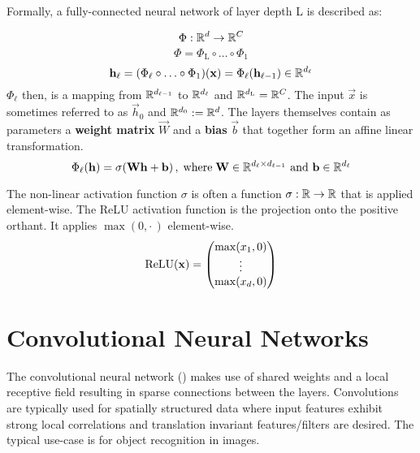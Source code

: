 Formally, a fully-connected neural network of layer depth L is described as:

\[
    \Phi : \mathbb{R}^d \to \mathbb{R}^C
\]
\[
    \Phi = \Phi_\text{L} \circ \ldots \circ \Phi_1
\]
\[
    \mathbf h_\ell = (\Phi_\ell \circ \ldots \circ \Phi_1) (\mathbf x) =
    \Phi_\ell(\mathbf h_{\ell-1}) \in \mathbb{R}^{d_\ell}
\]
$\Phi_\ell$ then, is a mapping from $\mathbb{R}^{d_{\ell-1}}$ to $\mathbb{R}^{d_\ell}$ and $\mathbb{R}^{d_\textnormal{L}} = \mathbb{R}^C$.
The input $\vec x$ is sometimes referred to as $\vec h_0$ and $\mathbb{R}^{d_0} := \mathbb{R}^d$.
The layers themselves contain as parameters a \textbf{weight matrix} $\vec W$ and a \textbf{bias} $\vec b$
that together form an affine linear transformation.
\[
    \Phi_\ell(\mathbf h) = \sigma (\mathbf W \mathbf h + \mathbf b) \,, \; \text{where} \;
    \mathbf W \in \mathbb{R}^{d_\ell \times d_{\ell-1}} \text{ and } 
    \mathbf b \in \mathbb{R}^{d_\ell}
\]

The non-linear activation function $\sigma$ is often a function $\sigma:\mathbb{R}\to\mathbb{R}$ that is applied element-wise.
The ReLU activation function is the projection onto the positive orthant.
It applies $\max(0, \cdot \,)$ element-wise.
\begin{equation}
\label{eqn:relu}
    \operatorname{\textnormal{ReLU}}(\mathbf x) = 
    \begin{pmatrix}
        \max(x_1, 0) \\
        \vdots \\
        \max(x_d, 0) \\
    \end{pmatrix}
\end{equation}


\section{Convolutional Neural Networks}
\label{sec:convolutions}
The convolutional neural network (\cite{Convnet_origins}) 
makes use of shared weights and a local receptive field 
resulting in sparse connections between the layers. 
Convolutions are typically used for spatially structured data 
where input features exhibit strong local correlations and 
translation invariant features/filters are desired.
The typical use-case is for object recognition in images.

